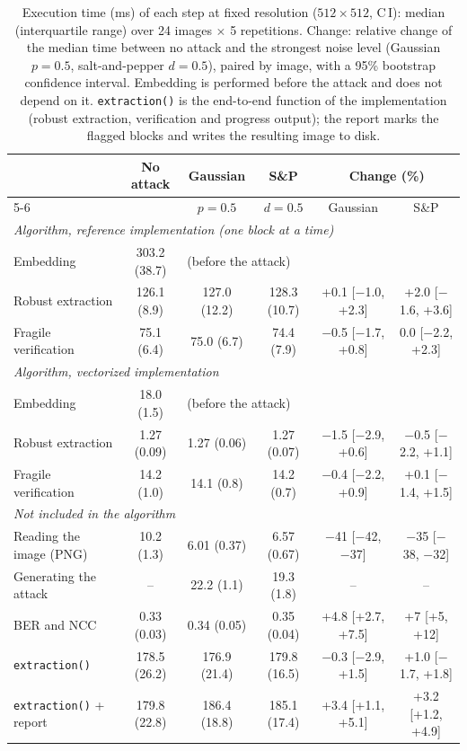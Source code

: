\begin{table}[t]
\centering
\caption{Execution time (ms) of each step at fixed resolution ($512\times512$, C\,I): median (interquartile range) over 24 images $\times$ 5 repetitions. Change: relative change of the median time between no attack and the strongest noise level (Gaussian $p=0.5$, salt-and-pepper $d=0.5$), paired by image, with a 95\% bootstrap confidence interval. Embedding is performed before the attack and does not depend on it. \texttt{extraction()} is the end-to-end function of the implementation (robust extraction, verification and progress output); the report marks the flagged blocks and writes the resulting image to disk.}
\label{tab:runtime_noise}
\footnotesize
\setlength{\tabcolsep}{2pt}
\begin{tabular}{lccccc}
\toprule
 & No attack & Gaussian & S\&P & \multicolumn{2}{c}{Change (\%)} \\
\cmidrule(lr){5-6}
 &  & $p=0.5$ & $d=0.5$ & Gaussian & S\&P \\
\midrule
\multicolumn{6}{l}{\emph{Algorithm, reference implementation (one block at a time)}} \\
Embedding & 303.2 (38.7) & \multicolumn{4}{l}{(before the attack)} \\
Robust extraction & 126.1 (8.9) & 127.0 (12.2) & 128.3 (10.7) & +0.1 [$-$1.0, +2.3] & +2.0 [$-$1.6, +3.6] \\
Fragile verification & 75.1 (6.4) & 75.0 (6.7) & 74.4 (7.9) & $-$0.5 [$-$1.7, +0.8] & 0.0 [$-$2.2, +2.3] \\
\midrule
\multicolumn{6}{l}{\emph{Algorithm, vectorized implementation}} \\
Embedding & 18.0 (1.5) & \multicolumn{4}{l}{(before the attack)} \\
Robust extraction & 1.27 (0.09) & 1.27 (0.06) & 1.27 (0.07) & $-$1.5 [$-$2.9, +0.6] & $-$0.5 [$-$2.2, +1.1] \\
Fragile verification & 14.2 (1.0) & 14.1 (0.8) & 14.2 (0.7) & $-$0.4 [$-$2.2, +0.9] & +0.1 [$-$1.4, +1.5] \\
\midrule
\multicolumn{6}{l}{\emph{Not included in the algorithm}} \\
Reading the image (PNG) & 10.2 (1.3) & 6.01 (0.37) & 6.57 (0.67) & $-$41 [$-$42, $-$37] & $-$35 [$-$38, $-$32] \\
Generating the attack & -- & 22.2 (1.1) & 19.3 (1.8) & -- & -- \\
BER and NCC & 0.33 (0.03) & 0.34 (0.05) & 0.35 (0.04) & +4.8 [+2.7, +7.5] & +7 [+5, +12] \\
\texttt{extraction()} & 178.5 (26.2) & 176.9 (21.4) & 179.8 (16.5) & $-$0.3 [$-$2.9, +1.5] & +1.0 [$-$1.7, +1.8] \\
\texttt{extraction()} + report & 179.8 (22.8) & 186.4 (18.8) & 185.1 (17.4) & +3.4 [+1.1, +5.1] & +3.2 [+1.2, +4.9] \\
\bottomrule
\end{tabular}
\end{table}
